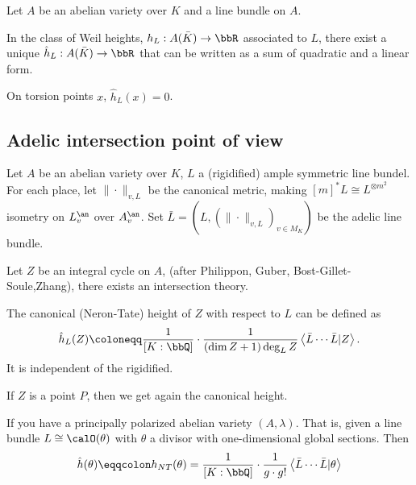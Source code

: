 Let $A$ be an abelian variety over $K$ and a line bundle on $A$.

\begin{theorem}[label=\labelNFM{thm:ntheight}, status=draft, tag=0000000]
	In the class of Weil heights, $h_L: A(\bar{K}) \to \bbR$ associated to $L$, there exist a unique $\hat{h}_L: A(\bar{K}) \to \bbR$ that can be written as a sum of quadratic and a linear form.
\end{theorem}

\begin{corollary}[label=\labelNFM{cor:c1}, status=draft, tag=0000000]
	On torsion points $x$, $\hat{h}_L(x) = 0$.
\end{corollary}


\subsection[status=draft,tag=0000000,label=\labelNFM{subsec:adelicintersection}]{Adelic intersection point of view}

Let $A$ be an abelian variety over $K$, $L$ a (rigidified) ample symmetric line bundel.
For each place, let $\|\cdot\|_{v,L}$ be the canonical metric, making $[m]^*L \cong L^{\otimes m^2}$ isometry on $L_v^\an$ over $A_v^\an$.
Set $\bar{L} = (L,(\|\cdot\|_{v,L})_{v \in M_K})$ be the adelic line bundle.

Let $Z$ be an integral cycle on $A$, (after Philippon, Guber, Bost-Gillet-Soule,Zhang), there exists an intersection theory.

\begin{definition}[label=\labelNFM{def:hi}, status=draft, tag=0000000]
	The canonical (Neron-Tate) height of $Z$ with respect to $L$ can be defined as
	\[ \hat{h}_L(Z) \coloneqq \frac{1}{[K:\bbQ]} \cdot \frac{1}{(\dim Z + 1) \deg_L Z} \left<\bar{L} \cdots \bar{L} | Z \right>. \]
	It is independent of the rigidified.
\end{definition}

\begin{example}[label=\labelNFM{eg:po}, status=draft, tag=0000000]
	If $Z$ is a point $P$, then we get again the canonical height.
\end{example}

\begin{example}[label=\labelNFM{eg:ag}, status=draft, tag=0000000]
	If you have a principally polarized abelian variety $(A,\lambda)$.
	That is, given a line bundle $L \cong \calO(\theta)$ with $\theta$ a divisor with one-dimensional global sections.
	Then
	\[ \hat{h}(\theta) \eqqcolon h_{NT}(\theta) = \frac{1}{[K:\bbQ]} \cdot \frac{1}{g \cdot g!} \left<\bar{L} \cdots \bar{L} | \theta \right> \]
\end{example}

